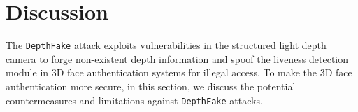 
\section{Discussion}
The \texttt{DepthFake} attack exploits vulnerabilities in the structured light depth camera to forge non-existent depth information and spoof the liveness detection module in 3D face authentication systems for illegal access. To make the 3D face authentication more secure, in this section, we discuss the potential countermeasures and limitations against \texttt{DepthFake} attacks.




